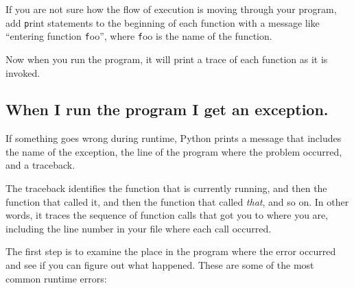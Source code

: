 \documentclass[
DIV=11,
fontsize=13,
twoside,
headinclude=false,
titlepage=firstiscover,
abstract=true,
headsepline=true,
footsepline=true,
chapterprefix=true, %
headings=big,
bibliography=totoc,%
captions=tableheading
]{scrbook}
\theoremstyle{definition}
\begin{document}
If you are not sure how the flow of execution is moving through
your program, add {\texttt print} statements to the beginning of each
function with a message like ``entering function {\texttt foo}'', where
{\texttt foo} is the name of the function.

Now when you run the program, it will print a trace of each
function as it is invoked.


\subsection{When I run the program I get an exception.}

If something goes wrong during runtime, Python
prints a message that includes the name of the
exception, the line of the program where the problem occurred,
and a traceback.

The traceback identifies the function that is currently running, and
then the function that called it, and then the function that called
{\em that}, and so on.  In other words, it traces the sequence of
function calls that got you to where you are, including the line
number in your file where each call occurred.

The first step is to examine the place in the program where
the error occurred and see if you can figure out what happened.
These are some of the most common runtime errors:
\end{document}
